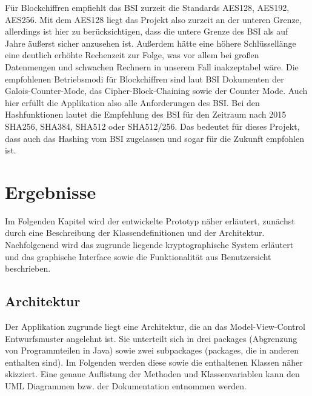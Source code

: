 \documentclass[13pt,a4paper,bibliography=totocnumbered,listof=totocnumbered]{scrartcl}
\begin{document}
Für Blockchiffren empfiehlt das BSI zurzeit die Standards AES128, AES192, AES256. Mit dem AES128 liegt das Projekt also zurzeit an der unteren Grenze, allerdings ist hier zu berücksichtigen, dass die untere Grenze des BSI als auf Jahre äußerst sicher anzusehen ist. Außerdem hätte eine höhere Schlüssellänge eine deutlich erhöhte Rechenzeit zur Folge, was vor allem bei großen Datenmengen und schwachen Rechnern in unserem Fall inakzeptabel wäre. Die empfohlenen Betriebsmodi für Blockchiffren sind laut BSI Dokumenten der Galois-Counter-Mode, das Cipher-Block-Chaining sowie der Counter Mode. Auch hier erfüllt die Applikation also alle Anforderungen des BSI. Bei den Hashfunktionen lautet die Empfehlung des BSI für den Zeitraum nach 2015 SHA256, SHA384, SHA512 oder SHA512/256. Das bedeutet für dieses Projekt, dass auch das Hashing vom BSI zugelassen und sogar für die Zukunft empfohlen ist.\\
 \cite{12}\cite{13}

\pagebreak


\section{Ergebnisse}\label{ErgebnisseV}
Im Folgenden Kapitel wird der entwickelte Prototyp näher erläutert, zunächst durch eine Beschreibung der Klassendefinitionen und der Architektur. Nachfolgenend wird das zugrunde liegende kryptographische System erläutert und das graphische Interface sowie die Funktionalität aus Benutzersicht beschrieben.

\subsection{Architektur}
Der Applikation zugrunde liegt eine Architektur, die an das Model-View-Control Entwurfsmuster angelehnt ist. Sie unterteilt sich in drei packages (Abgrenzung von Programmteilen in Java) sowie zwei subpackages (packages, die in anderen enthalten sind). Im Folgenden werden diese sowie die enthaltenen Klassen näher skizziert. Eine genaue Auflistung der Methoden und Klassenvariablen kann den UML Diagrammen bzw. der Dokumentation entnommen werden.
\end{document}
